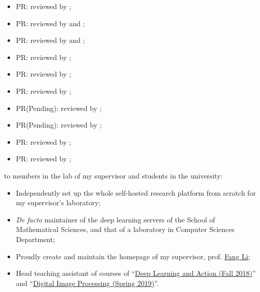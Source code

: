 \begin{itemize}
    \item PR:  reviewed by \mbauman;
    \item PR:  reviewed by \evizero and \timholy;
    \item PR:  reviewed by \evizero and \timholy;
    \item PR:  reviewed by \julio;
    \item PR:  reviewed by \evizero;
    \item PR:  reviewed by \timholy;
    \item PR(Pending):  reviewed by \zygmunt;
    \item PR(Pending):  reviewed by \mikeinnes;
    \item PR:  reviewed by \mikeinnes;
    \item PR:  reviewed by \mikeinnes;
\end{itemize}
to members in the lab of my supervisor and students in the university:
\begin{itemize}
    \item Independently set up the whole self-hosted research platform from scratch for my supervisor's laboratory;
    \item \textit{De facto} maintainer of the deep learning servers of the School of Mathematical Sciences, and that of a laboratory in Computer Sciences Department;
    \item Proudly create and maintain the homepage of my supervisor, prof. \href{http://math.ecnu.edu.cn/~fli/}{\textsf{Fang Li}};
    \item Head teaching assistant of courses of ``\href{http://math.ecnu.edu.cn/~fli/Teaching/DeepLearning/Fall2018/index.html}{Deep Learning and Action (Fall 2018)}''  and ``\href{http://math.ecnu.edu.cn/~fli/Teaching/DigitalImageProcessing/Spring2019/index.html}{Digital Image Processing (Spring 2019)}''.
\end{itemize}

